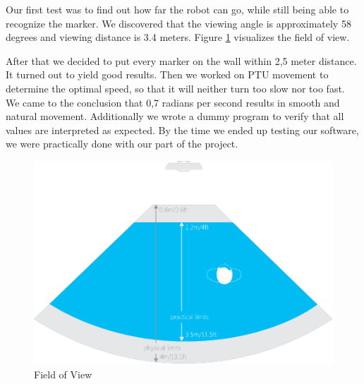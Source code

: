 Our first test was to find out how far the robot can go, while still being able to recognize the marker. We discovered that the viewing angle is approximately 58 degrees and viewing distance is 3.4 meters. Figure \ref{Field of View} visualizes the field of view.

After that we decided to put every marker on the wall within 2,5 meter distance. It turned out to yield good results. Then we worked on PTU movement to determine the optimal speed, so that it will neither turn too slow nor too fast. We came to the conclusion that 0,7 radians per second results in smooth and natural movement. Additionally we wrote a dummy program to verify that all values are interpreted as expected. By the time we ended up testing our software, we were practically done with our part of the project.

\begin{figure}
\begin{center}
\includegraphics[scale=0.8]{graphics/view_field.png}
\caption{Field of View}
\label{Field of View}
\end{center}
\end{figure}
